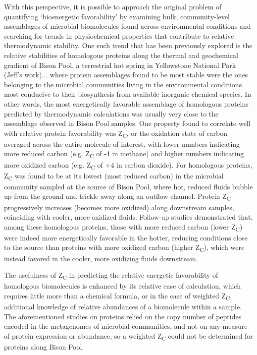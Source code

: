 With this perspective, it is possible to approach the original problem of quantifying `bioenergetic favorability' by examining bulk, community-level assemblages of microbial biomolecules found across environmental conditions and searching for trends in physiochemical properties that contribute to relative thermodynamic stability. One such trend that has been previously explored is the relative stabilities of homologous proteins along the thermal and geochemical gradient of Bison Pool, a terrestrial hot spring in Yellowstone National Park (Jeff's work)... where protein assemblages found to be most stable were the ones belonging to the microbial communities living in the environmental conditions most conducive to their biosynthesis from available inorganic chemical species. In other words, the most energetically favorable assemblage of homologous proteins predicted by thermodynamic calculations was usually very close to the assemblage observed in Bison Pool samples. One property found to correlate well with relative protein favorability was Z\textsubscript{C}, or the oxidation state of carbon averaged across the entire molecule of interest, with lower numbers indicating more reduced carbon (e.g. Z\textsubscript{C} of -4 in methane) and higher numbers indicating more oxidized carbon (e.g. Z\textsubscript{C} of +4 in carbon dioxide). For homologous proteins, Z\textsubscript{C} was found to be at its lowest (most reduced carbon) in the microbial community sampled at the source of Bison Pool, where hot, reduced fluids bubble up from the ground and trickle away along an outflow channel. Protein Z\textsubscript{C} progressively increases (becomes more oxidized) along downstream samples, coinciding with cooler, more oxidized fluids. Follow-up studies demonstrated that, among these homologous proteins, those with more reduced carbon (lower Z\textsubscript{C}) were indeed more energetically favorable in the hotter, reducing conditions close to the source than proteins with more oxidized carbon (higher Z\textsubscript{C}), which were instead favored in the cooler, more oxidizing fluids downstream.

The usefulness of Z\textsubscript{C} in predicting the relative energetic favorability of homologous biomolecules is enhanced by its relative ease of calculation, which requires little more than a chemical formula, or in the case of weighted Z\textsubscript{C}, additional knowledge of relative abundances of a biomolecule within a sample. The aforementioned studies on proteins relied on the copy number of peptides encoded in the metagenomes of microbial communities, and not on any measure of protein expression or abundance, so a weighted Z\textsubscript{C} could not be determined for proteins along Bison Pool.


